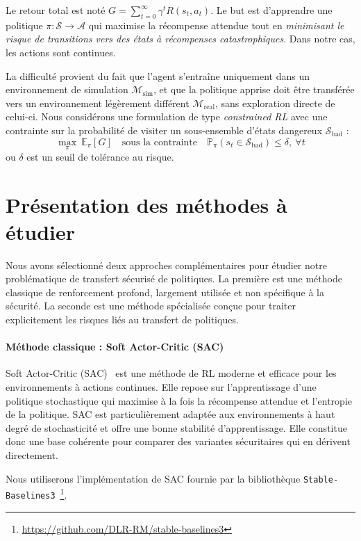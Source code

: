 \documentclass{article}
\begin{document}
Le retour total est noté $G = \sum_{t=0}^{\infty} \gamma^t R(s_t, a_t)$. Le but est d’apprendre une politique $\pi: \mathcal{S} \to \mathcal{A}$ qui maximise la récompense attendue tout en \textit{minimisant le risque de transitions vers des états à récompenses catastrophiques}. Dans notre cas, les actions sont continues.

La difficulté provient du fait que l’agent s'entraîne uniquement dans un environnement de simulation $\mathcal{M}_{\text{sim}}$, et que la politique apprise doit être transférée vers un environnement légèrement différent $\mathcal{M}_{\text{real}}$, sans exploration directe de celui-ci. Nous considérons une formulation de type \textit{constrained RL} avec une contrainte sur la probabilité de visiter un sous-ensemble d’états dangereux $\mathcal{S}_{\text{bad}}$ :
\[
\max_{\pi} \ \mathbb{E}_{\pi}[G] \quad \text{sous la contrainte} \quad \mathbb{P}_{\pi}(s_t \in \mathcal{S}_{\text{bad}}) \leq \delta, \ \forall t
\]
ou $\delta$ est un seuil de tolérance au risque.

\section*{Présentation des méthodes à étudier}

Nous avons sélectionné deux approches complémentaires pour étudier notre problématique de transfert sécurisé de politiques. La première est une méthode classique de renforcement profond, largement utilisée et non spécifique à la sécurité. La seconde est une méthode spécialisée conçue pour traiter explicitement les risques liés au transfert de politiques.

\paragraph{Méthode classique : Soft Actor-Critic (SAC)}
Soft Actor-Critic (SAC)~\cite{haarnoja2018soft} est une méthode de RL moderne et efficace pour les environnements à actions continues. Elle repose sur l’apprentissage d’une politique stochastique qui maximise à la fois la récompense attendue et l’entropie de la politique. SAC est particulièrement adaptée aux environnements à haut degré de stochasticité et offre une bonne stabilité d’apprentissage. Elle constitue donc une base cohérente pour comparer des variantes sécuritaires qui en dérivent directement.

Nous utiliserons l’implémentation de SAC fournie par la bibliothèque \texttt{Stable-Baselines3}~\footnote{\url{https://github.com/DLR-RM/stable-baselines3}}.
\end{document}
